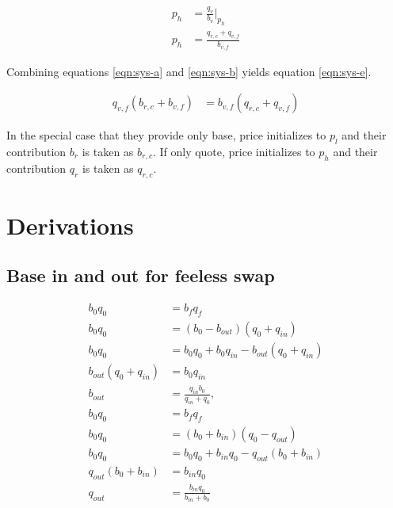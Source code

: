 \documentclass[table, twocolumn]{article}
\begin{document}
\begin{align} \label{eqn:sys-d}
  p_h &= \frac{q_v}{b_v}|_{p_h} \nonumber \\
  p_h &= \frac{q_{r, c} + q_{v, f}}{b_{v, f}}
\end{align}

Combining equations \ref{eqn:sys-a} and \ref{eqn:sys-b} yields equation \ref{eqn:sys-e}.

\begin{align} \label{eqn:sys-e}
  q_{v, f} (b_{r, c} + b_{v, f}) &= b_{v, f} (q_{r, c} + q_{v, f})
\end{align}

In the special case that they provide only base, price initializes to $p_l$ and their
contribution $b_r$ is taken as $b_{r, c}$. If only quote, price initializes to $p_h$ and
their contribution $q_r$ is taken as $q_{r, c}$.

\appendix

\section{Derivations}

\subsection{Base in and out for feeless swap} \label{eqn:b-q-out-simple-derivation}

\begin{align}
  b_0 q_0               & = b_f q_f \nonumber                                      \\
  b_0 q_0               & = (b_0 - b_{out})(q_0 + q_{in}) \nonumber                \\
  b_0 q_0               & = b_0 q_0 + b_0 q_{in} - b_{out}(q_0 + q_{in}) \nonumber \\
  b_{out}(q_0 + q_{in}) & = b_{0} q_{in} \nonumber                                 \\
  b_{out}               & = \frac{q_{in} b_0}{q_{in} + q_0}, \nonumber             \\
  b_0 q_0               & = b_f q_f \nonumber                                      \\
  b_0 q_0               & = (b_0 + b_{in})(q_0 - q_{out}) \nonumber                \\
  b_0 q_0               & = b_0 q_0 + b_{in} q_0 - q_{out}(b_0 + b_{in}) \nonumber \\
  q_{out}(b_0 + b_{in}) & = b_{in} q_0 \nonumber                                   \\
  q_{out}               & = \frac{b_{in} q_0}{b_{in} + b_0}
\end{align}
\end{document}
